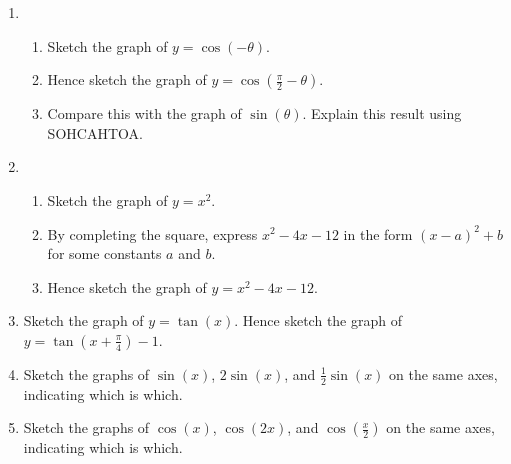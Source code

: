 \documentclass{article}
\begin{document}
\begin{enumerate}
	\item \begin{enumerate}
		\item Sketch the graph of $y=\cos(-\theta)$.
		\item Hence sketch the graph of $y=\cos\left(\frac{\pi}{2}-\theta\right)$.
		\item Compare this with the graph of $\sin(\theta)$. Explain this result using SOHCAHTOA.
		\end{enumerate}
	\item \begin{enumerate}
		\item Sketch the graph of $y=x^2$.
		\item By completing the square, express $x^2-4x-12$ in the form $(x-a)^2+b$ for some constants $a$ and $b$.
		\item Hence sketch the graph of $y=x^2-4x-12$.
		\end{enumerate}
	\item Sketch the graph of $y=\tan(x)$. Hence sketch the graph of $y=\tan\left(x+\frac{\pi}{4}\right)-1$.
	\item Sketch the graphs of $\sin(x)$, $2\sin(x)$, and $\frac{1}{2}\sin(x)$ on the same axes, indicating which is which.
	\item Sketch the graphs of $\cos(x)$, $\cos(2x)$, and $\cos\left(\frac{x}{2}\right)$ on the same axes, indicating which is which.
\end{enumerate}
\end{document}
